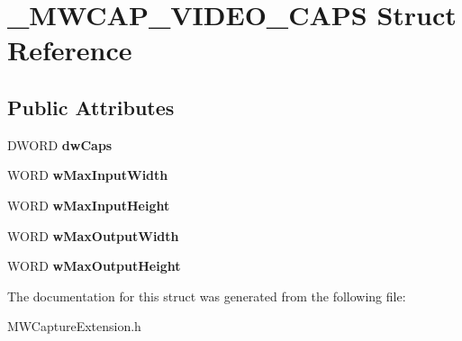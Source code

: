 \hypertarget{struct__MWCAP__VIDEO__CAPS}{\section{\-\_\-\-M\-W\-C\-A\-P\-\_\-\-V\-I\-D\-E\-O\-\_\-\-C\-A\-P\-S Struct Reference}
\label{struct__MWCAP__VIDEO__CAPS}
}
\subsection*{Public Attributes}
\begin{DoxyCompactItemize}
\item 
\hypertarget{struct__MWCAP__VIDEO__CAPS_a46bd24012352d117a2234d858c8bcbee}{D\-W\-O\-R\-D {\bfseries dw\-Caps}}\label{struct__MWCAP__VIDEO__CAPS_a46bd24012352d117a2234d858c8bcbee}

\item 
\hypertarget{struct__MWCAP__VIDEO__CAPS_aff17d5f5283c7d4f1a62df757b67df3d}{W\-O\-R\-D {\bfseries w\-Max\-Input\-Width}}\label{struct__MWCAP__VIDEO__CAPS_aff17d5f5283c7d4f1a62df757b67df3d}

\item 
\hypertarget{struct__MWCAP__VIDEO__CAPS_a480b1d6753685ae81f0370e8dccb1bf4}{W\-O\-R\-D {\bfseries w\-Max\-Input\-Height}}\label{struct__MWCAP__VIDEO__CAPS_a480b1d6753685ae81f0370e8dccb1bf4}

\item 
\hypertarget{struct__MWCAP__VIDEO__CAPS_afd9a9bc26034b24bc4516cdecaa8f0f3}{W\-O\-R\-D {\bfseries w\-Max\-Output\-Width}}\label{struct__MWCAP__VIDEO__CAPS_afd9a9bc26034b24bc4516cdecaa8f0f3}

\item 
\hypertarget{struct__MWCAP__VIDEO__CAPS_abe12cab2451ef9a339310c986528defc}{W\-O\-R\-D {\bfseries w\-Max\-Output\-Height}}\label{struct__MWCAP__VIDEO__CAPS_abe12cab2451ef9a339310c986528defc}

\end{DoxyCompactItemize}


The documentation for this struct was generated from the following file\-:\begin{DoxyCompactItemize}
\item 
M\-W\-Capture\-Extension.\-h\end{DoxyCompactItemize}
